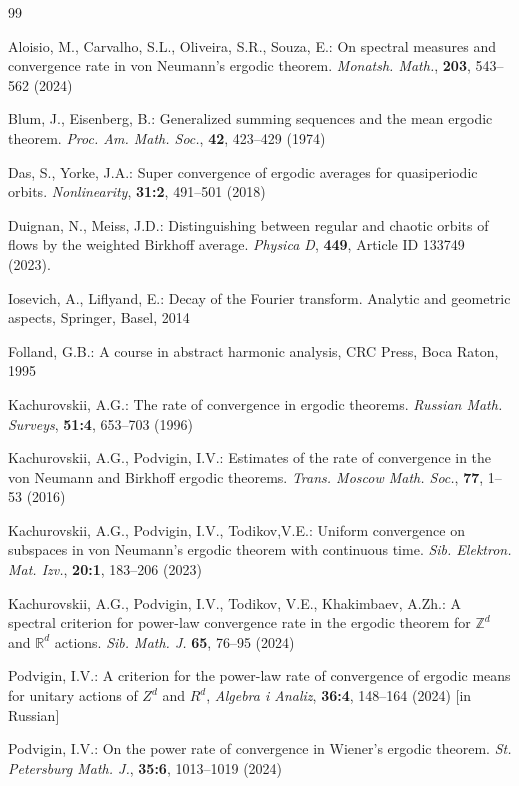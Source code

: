 \documentclass[12pt]{article}
\begin{document}
\begin{thebibliography}{99}

Aloisio, M., Carvalho, S.L., Oliveira, S.R., Souza, E.:
On spectral measures and convergence rate in von Neumann's ergodic theorem. \emph{Monatsh. Math.}, \textbf{203},  543--562 (2024)

Blum, J., Eisenberg, B.: Generalized summing sequences and the mean ergodic theorem. \emph{Proc. Am. Math. Soc.}, \textbf{42}, 423--429 (1974)

Das, S., Yorke, J.A.: Super convergence of ergodic averages for quasiperiodic orbits. \emph{Nonlinearity}, \textbf{31:2}, 491--501 (2018) 

Duignan, N., Meiss, J.D.: Distinguishing between regular and chaotic orbits of flows by the weighted Birkhoff average. \emph{Physica D}, \textbf{449}, Article ID 133749 (2023).

Iosevich, A., Liflyand, E.: Decay of the Fourier transform. Analytic and geometric aspects,  Springer, Basel, 2014

Folland, G.B.: A course in abstract harmonic analysis, CRC Press, Boca Raton, 1995

Kachurovskii, A.G.: The rate of convergence in ergodic theorems. \emph{Russian Math. Surveys}, \textbf {51:4}, 653--703 (1996)

Kachurovskii, A.G., Podvigin, I.V.: Estimates of the rate of convergence in the von Neumann and Birkhoff ergodic theorems. \emph{Trans. Moscow Math. Soc.}, \textbf{77}, 1--53 (2016)

Kachurovskii, A.G., Podvigin, I.V., Todikov,V.E.: Uniform convergence on subspaces in von Neumann's ergodic theorem with continuous time. \emph{Sib. Elektron. Mat. Izv.}, \textbf{20:1}, 183--206 (2023)

Kachurovskii, A.G., Podvigin, I.V., Todikov, V.E., Khakimbaev, A.Zh.: A spectral criterion for power-law convergence rate in the ergodic theorem for $\mathbb{Z}^d$ and $\mathbb{R}^d$
actions. \emph{Sib. Math. J.} \textbf{65}, 76--95 (2024)

Podvigin, I.V.:  A criterion for the power-law rate of convergence of ergodic means for unitary actions of $Z^d$ and $R^d$, \emph{Algebra i Analiz}, \textbf{36:4}, 148--164 (2024) [in Russian]

Podvigin, I.V.: On the power rate of convergence in Wiener's ergodic theorem. \emph{St. Petersburg Math. J.}, \textbf{35:6}, 1013--1019 (2024)


\end{thebibliography}
\end{document}
